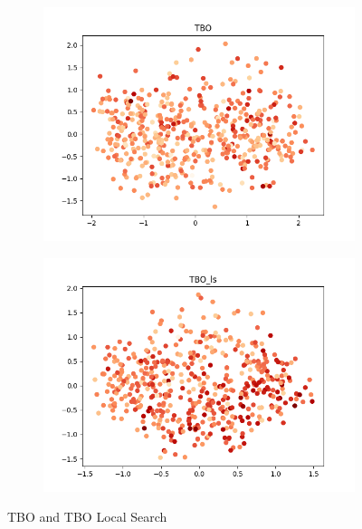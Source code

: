 \documentclass[11pt, letterpaper, onecolumn]{article}
\begin{document}
\begin{figure}[h!]
  \centering
  \begin{subfigure}[b]{0.4\linewidth}
    \includegraphics[width=\linewidth]{graphs/TBO__pca.png}
  \end{subfigure}
  \begin{subfigure}[b]{0.4\linewidth}
    \includegraphics[width=\linewidth]{graphs/TBO_ls__pca.png}
  \end{subfigure}
  \caption{TBO and TBO Local Search}
  \label{fig:coffee}
\end{figure}
\end{document}
